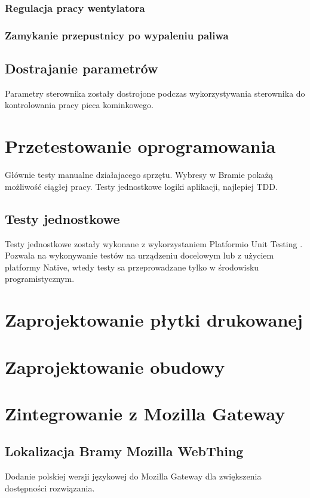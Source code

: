 \documentclass[12pt]{report}
\begin{document}
 \subsection{Regulacja pracy wentylatora}
 \subsection{Zamykanie przepustnicy po wypaleniu paliwa}
 
 \section{Dostrajanie parametrów}
 Parametry sterownika zostały dostrojone podczas wykorzystywania sterownika do kontrolowania pracy pieca kominkowego.
 
 
 \chapter{Przetestowanie oprogramowania}
 Głównie testy manualne działajacego sprzętu.
 Wybresy w Bramie pokażą możliwość ciągłej pracy.
 Testy jednostkowe logiki aplikacji, najlepiej TDD.
 \section{Testy jednostkowe}
 Testy jednostkowe zostały wykonane z wykorzystaniem Platformio Unit Testing \cite{PIOUnitTesting}. Pozwala na wykonywanie testów na urządzeniu docelowym lub z użyciem platformy Native, wtedy testy sa przeprowadzane tylko w środowisku programistycznym.
 
 
 \chapter{Zaprojektowanie płytki drukowanej}
 
 
 \chapter{Zaprojektowanie obudowy}

 
 \chapter{Zintegrowanie z Mozilla Gateway}
 \section{Lokalizacja Bramy Mozilla WebThing}
 Dodanie polskiej wersji językowej do Mozilla Gateway dla zwiększenia dostępności rozwiązania.
\end{document}
